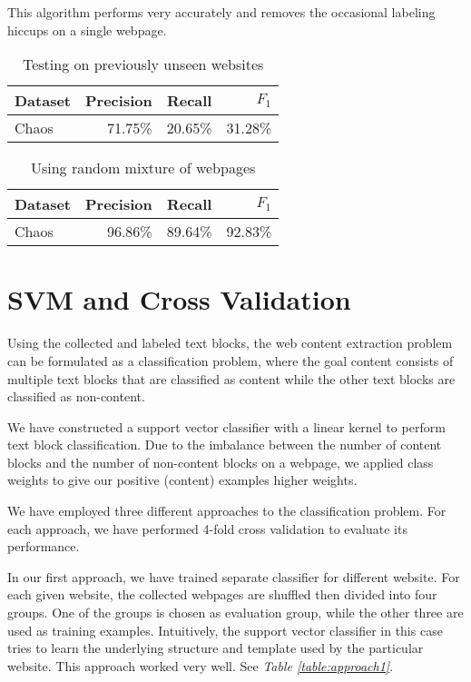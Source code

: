\documentclass{acm_proc_article-sp}
\begin{document}
This algorithm performs very accurately and removes the occasional labeling hiccups on a single webpage.



\begin{table}
\centering
\caption{\label{table:approach2}Testing on previously unseen websites}
\begin{tabular}{|l|r|r|r|} \hline
Dataset&Precision&Recall&$F_1$\\ \hline\hline
Chaos&71.75\%&20.65\%&31.28\%\\ \hline
\end{tabular}
\end{table}

\begin{table}
\centering
\caption{\label{table:approach3}Using random mixture of webpages}
\begin{tabular}{|l|r|r|r|} \hline
Dataset&Precision&Recall&$F_1$\\ \hline\hline
Chaos&96.86\%&89.64\%&92.83\%\\ \hline
\end{tabular}
\end{table}

\newpage
\section{SVM and Cross Validation}

Using the collected and labeled text blocks, the web content extraction problem can be formulated as a classification problem, where the goal content consists of multiple text blocks that are classified as content while the other text blocks are classified as non-content.

We have constructed a support vector classifier with a linear kernel to perform text block classification. Due to the imbalance between the number of content blocks and the number of non-content blocks on a webpage, we applied class weights to give our positive (content) examples higher weights.

We have employed three different approaches to the classification problem. For each approach, we have performed 4-fold cross validation to evaluate its performance.

In our first approach, we have trained separate classifier for different website. For each given website, the collected webpages are shuffled then divided into four groups. One of the groups is chosen as evaluation group, while the other three are used as training examples. Intuitively, the support vector classifier in this case tries to learn the underlying structure and template used by the particular website. This approach worked very well. See \emph{Table \ref{table:approach1}}.
\end{document}
